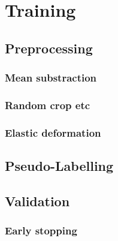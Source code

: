 \chapter{Training}

	\section {Preprocessing}

		\subsection{Mean substraction}

		\subsection {Random crop etc}

		\subsection{Elastic deformation}


	\section {Pseudo-Labelling}

	\section {Validation}
		
		\subsection{Early stopping}